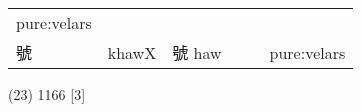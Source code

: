 \documentclass[14pt,a4paper]{scrartcl}
\begin{document}
\begin{longtable}[c]{@{}llllll@{}}
\begin{minipage}[t]{0.14\columnwidth}\raggedright\strut
pure:velars
\strut\end{minipage}\tabularnewline
\begin{minipage}[t]{0.14\columnwidth}\raggedright\strut
號
\strut\end{minipage} &
\begin{minipage}[t]{0.14\columnwidth}\raggedright\strut
khawX
\strut\end{minipage} &
\begin{minipage}[t]{0.14\columnwidth}\raggedright\strut
號 haw
\strut\end{minipage} &
\begin{minipage}[t]{0.14\columnwidth}\raggedright\strut
\strut\end{minipage} &
\begin{minipage}[t]{0.14\columnwidth}\raggedright\strut
\strut\end{minipage} &
\begin{minipage}[t]{0.14\columnwidth}\raggedright\strut
pure:velars
\strut\end{minipage}\tabularnewline
\bottomrule
\end{longtable}

(23) 1166 {[}3{]}
\end{document}
